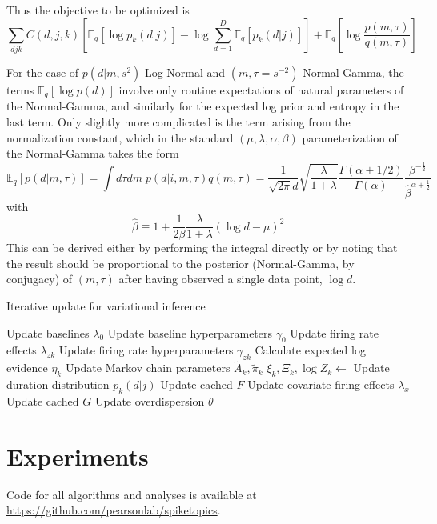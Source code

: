 Thus the objective to be optimized is
\begin{equation}
    \sum_{d j k} C(d, j, k) \left[\mathbb{E}_q \left[\log p_k(d|j)\right] - \log \sum_{d=1}^D \mathbb{E}_q\left[p_k(d|j) \right] \right] + \mathbb{E}_q\left[\log \frac{p(m, \tau)}{q(m, \tau)} \right]
\end{equation}

For the case of $p(d|m, s^2)$ Log-Normal and $(m, \tau = s^{-2})$ Normal-Gamma, the terms $\mathbb{E}_q[\log p(d)]$ involve only routine expectations of natural parameters of the Normal-Gamma, and similarly for the expected log prior and entropy in the last term. Only slightly more complicated is the term arising from the normalization constant, which in the standard $(\mu, \lambda, \alpha, \beta)$ parameterization of the Normal-Gamma takes the form
\begin{equation}
    \mathbb{E}_q[p(d|m, \tau)] = \int d\tau dm \; p(d|i, m, \tau) q(m, \tau)
    = \frac{1}{\sqrt{2\pi}d} \sqrt{\frac{\lambda}{1 + \lambda}}
    \frac{\Gamma(\alpha + 1/2)}{\Gamma(\alpha)}
    \frac{\beta^{-\frac{1}{2}}}{\hat{\beta}^{\alpha + \frac{1}{2}}}
\end{equation}
with
\begin{equation}
    \hat{\beta} \equiv 1 + \frac{1}{2\beta} \frac{\lambda}{1 + \lambda}
    (\log d - \mu)^2
\end{equation}
This can be derived either by performing the integral directly or by noting that the result should be proportional to the posterior (Normal-Gamma, by conjugacy) of $(m, \tau)$ after having observed a single data point, $\log d$.

\begin{algorithm}[ht]
\caption{Iterative update for variational inference}\label{algo}
\begin{algorithmic}[1]
    \State Update baselines $\lambda_0$
    \State Update baseline hyperparameters $\gamma_0$
        \State Update firing rate effects $\lambda_{zk}$
        \State Update firing rate hyperparameters $\gamma_{zk}$
        \State Calculate expected log evidence $\eta_k$
        \State Update Markov chain parameters $\tilde{A}_k, \tilde{\pi}_k$
        \State $\xi_k, \Xi_k, \log Z_k \gets$
            \State Update duration distribution $p_k(d|j)$
        \EndIf
        \State Update cached $F$
    \EndFor
    \State Update covariate firing effects $\lambda_x$
    \State Update cached $G$
    \State Update overdispersion $\theta$
\EndProcedure
\end{algorithmic}
\end{algorithm}

\section{Experiments}
Code for all algorithms and analyses is available at \url{https://github.com/pearsonlab/spiketopics}.
